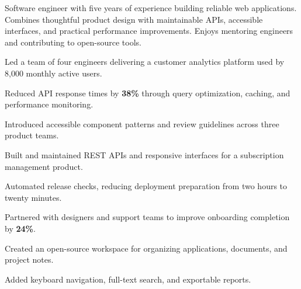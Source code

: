 \begin{resumecolumns}
Software engineer with five years of experience building reliable web applications.
Combines thoughtful product design with maintainable APIs, accessible interfaces,
and practical performance improvements. Enjoys mentoring engineers and contributing
to open-source tools.

\begin{highlights}
  \item Led a team of four engineers delivering a customer analytics platform
    used by 8,000 monthly active users.
  \item Reduced API response times by \textbf{38\%} through query optimization,
    caching, and performance monitoring.
  \item Introduced accessible component patterns and review guidelines across
    three product teams.
\end{highlights}

\begin{highlights}
  \item Built and maintained REST APIs and responsive interfaces for a
    subscription management product.
  \item Automated release checks, reducing deployment preparation from two
    hours to twenty minutes.
  \item Partnered with designers and support teams to improve onboarding
    completion by \textbf{24\%}.
\end{highlights}

\begin{highlights}
  \item Created an open-source workspace for organizing applications,
    documents, and project notes.
  \item Added keyboard navigation, full-text search, and exportable reports.
\end{highlights}


\end{resumecolumns}
